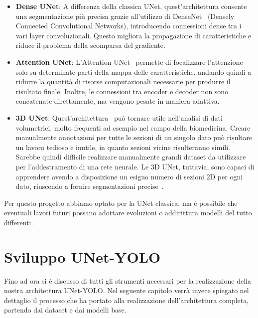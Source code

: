 \documentclass[12pt]{report}
\begin{document}
\begin{itemize}
	\item \textbf{Dense UNet}: A differenza della classica UNet, quest'architettura consente una segmentazione più precisa grazie all'utilizzo di DenseNet~\cite{8296389} (Densely Connected Convolutional Networks), introducendo connessioni dense tra i vari layer convoluzionali. Questo migliora la propagazione di caratteristiche e riduce il problema della scomparsa del gradiente.
	
	\item \textbf{Attention UNet}: L'Attention UNet~\cite{oktay2018attentionunetlearninglook} permette di focalizzare l'attenzione solo su determinate parti della mappa delle caratteristiche, andando quindi a ridurre la quantità di risorse computazionali necessarie per produrre il risultato finale. Inoltre, le connessioni tra encoder e decoder non sono concatenate direttamente, ma vengono pesate in maniera adattiva.
	
	\item \textbf{3D UNet}: Quest'architettura~\cite{çiçek20163dunetlearningdense} può tornare utile nell'analisi di dati volumetrici, molto frequenti ad esempio nel campo della biomedicina. Creare manualmente annotazioni per tutte le sezioni di un singolo dato può risultare un lavoro tedioso e inutile, in quanto sezioni vicine risulteranno simili. Sarebbe quindi difficile realizzare manualmente grandi dataset da utilizzare per l'addestramento di una rete neurale. Le 3D UNet, tuttavia, sono capaci di apprendere avendo a disposizione un esiguo numero di sezioni 2D per ogni dato, riuscendo a fornire segmentazioni precise~\cite{çiçek20163dunetlearningdense}.
\end{itemize}

Per questo progetto abbiamo optato per la UNet classica, ma è possibile che eventuali lavori futuri possano adottare evoluzioni o addirittura modelli del tutto differenti.

\chapter{Sviluppo UNet-YOLO}
\label{chap:sviluppo_unet_yolo}

Fino ad ora si è discusso di tutti gli strumenti necessari per la realizzazione della nostra architettura UNet-YOLO. Nel seguente capitolo verrà invece spiegato nel dettaglio il processo che ha portato alla realizzazione dell'architettura completa, partendo dai dataset e dai modelli base.
\end{document}
